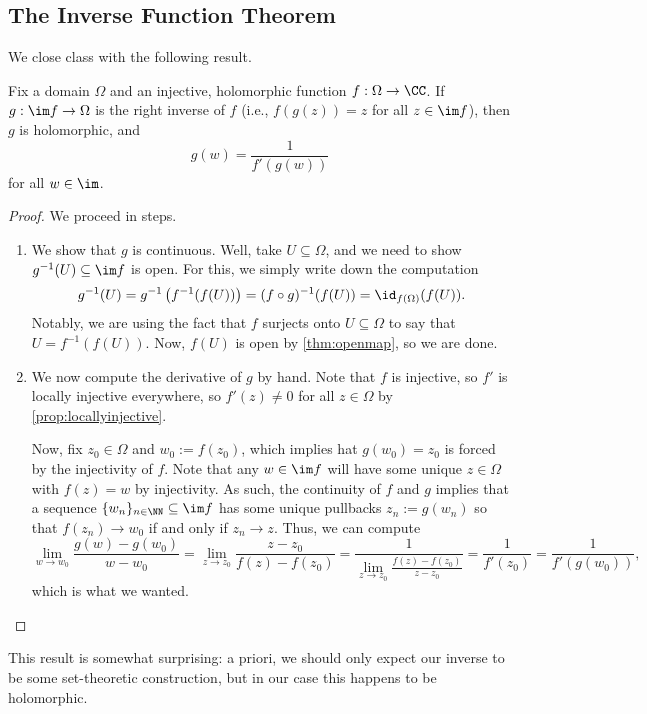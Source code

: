 \subsection{The Inverse Function Theorem}
We close class with the following result.
\begin{theorem}
	Fix a domain $\Omega$ and an injective, holomorphic function $f:\Omega\to\CC$. If $g:\im f\to\Omega$ is the right inverse of $f$ (i.e., $f(g(z))=z$ for all $z\in\im f$), then $g$ is holomorphic, and
	\[g(w)=\frac1{f'(g(w))}\]
	for all $w\in\im $.
\end{theorem}
\begin{proof}
	We proceed in steps.
	\begin{enumerate}
		\item We show that $g$ is continuous. Well, take $U\subseteq\Omega$, and we need to show $g^{-1}(U)\subseteq\im f$ is open. For this, we simply write down the computation
		\[g^{-1}(U)=g^{-1}\left(f^{-1}(f(U))\right)=(f\circ g)^{-1}(f(U))=\id_{f(\Omega)}(f(U)).\]
		Notably, we are using the fact that $f$ surjects onto $U\subseteq\Omega$ to say that $U=f^{-1}(f(U))$. Now, $f(U)$ is open by \autoref{thm:openmap}, so we are done.
		\item We now compute the derivative of $g$ by hand. Note that $f$ is injective, so $f'$ is locally injective everywhere, so $f'(z)\ne0$ for all $z\in\Omega$ by \autoref{prop:locallyinjective}.
		
		Now, fix $z_0\in\Omega$ and $w_0:=f(z_0)$, which implies hat $g(w_0)=z_0$ is forced by the injectivity of $f$. Note that any $w\in\im f$ will have some unique $z\in\Omega$ with $f(z)=w$ by injectivity. As such, the continuity of $f$ and $g$ implies that a sequence $\{w_n\}_{n\in\NN}\subseteq\im f$ has some unique pullbacks $z_n:=g(w_n)$ so that $f(z_n)\to w_0$ if and only if $z_n\to z$. Thus, we can compute
		\[\lim_{w\to w_0}\frac{g(w)-g(w_0)}{w-w_0}=\lim_{z\to z_0}\frac{z-z_0}{f(z)-f(z_0)}=\frac1{\lim_{z\to z_0}\frac{f(z)-f(z_0)}{z-z_0}}=\frac1{f'(z_0)}=\frac1{f'(g(w_0))},\]
		which is what we wanted.
		\qedhere
	\end{enumerate}
\end{proof}
\begin{remark}
	This result is somewhat surprising: a priori, we should only expect our inverse to be some set-theoretic construction, but in our case this happens to be holomorphic.
\end{remark}